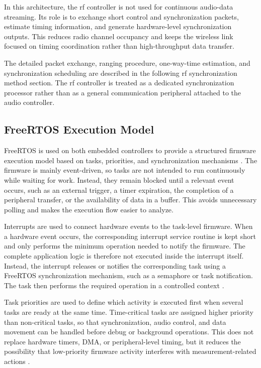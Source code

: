 In this architecture, the \acrshort{rf} controller is not used for continuous audio-data streaming. Its role is to exchange short control and synchronization packets, estimate timing information, and generate hardware-level synchronization outputs. This reduces radio channel occupancy and keeps the wireless link focused on timing coordination rather than high-throughput data transfer.

The detailed packet exchange, ranging procedure, one-way-time estimation, and synchronization scheduling are described in the following \acrshort{rf} synchronization method section. The \acrshort{rf} controller is treated as a dedicated synchronization processor rather than as a general communication peripheral attached to the audio controller.

\subsection{FreeRTOS Execution Model}
\label{sec:freertos_model}
FreeRTOS is used on both embedded controllers to provide a structured firmware execution model based on tasks, priorities, and synchronization mechanisms \cite{FreeRTOSOverview, FreeRTOSScheduling}. The firmware is mainly event-driven, so tasks are not intended to run continuously while waiting for work. Instead, they remain blocked until a relevant event occurs, such as an external trigger, a timer expiration, the completion of a peripheral transfer, or the availability of data in a buffer. This avoids unnecessary polling and makes the execution flow easier to analyze.

Interrupts are used to connect hardware events to the task-level firmware. When a hardware event occurs, the corresponding interrupt service routine is kept short and only performs the minimum operation needed to notify the firmware. The complete application logic is therefore not executed inside the interrupt itself. Instead, the interrupt releases or notifies the corresponding task using a FreeRTOS synchronization mechanism, such as a semaphore or task notification. The task then performs the required operation in a controlled context \cite{FreeRTOSTaskNotifications}.

Task priorities are used to define which activity is executed first when several tasks are ready at the same time. Time-critical tasks are assigned higher priority than non-critical tasks, so that synchronization, audio control, and data movement can be handled before debug or background operations. This does not replace hardware timers, DMA, or peripheral-level timing, but it reduces the possibility that low-priority firmware activity interferes with measurement-related actions \cite{FreeRTOSScheduling}.


